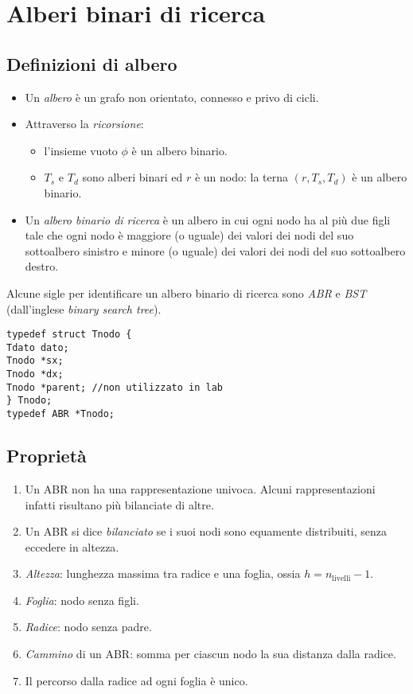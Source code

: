 \chapter{Alberi binari di ricerca}

\section{Definizioni di albero}
\begin{itemize}[noitemsep]
	\item Un \textit{albero} è un grafo non orientato, connesso e privo di cicli.
	\item Attraverso la \textit{ricorsione}:
	\begin{itemize}[noitemsep, nolistsep]
		\item l'insieme vuoto $\phi$ è un albero binario.
		\item $T_s$ e $T_d$ sono alberi binari ed $r$ è un nodo: la terna $(r, T_s, T_d)$ è un albero binario.
	\end{itemize}
	\item Un \textit{albero binario di ricerca} è un albero in cui ogni nodo ha al più due figli tale che ogni nodo è maggiore (o uguale) dei valori dei nodi del suo sottoalbero sinistro e minore (o uguale) dei valori dei nodi del suo sottoalbero destro.
\end{itemize}
Alcune sigle per identificare un albero binario di ricerca sono \textit{ABR} e \textit{BST} (dall'inglese \textit{binary search tree}).

\begin{lstlisting}[title={Implementazione di un albero binario di ricerca}]
typedef struct Tnodo {
Tdato dato;
Tnodo *sx;
Tnodo *dx;
Tnodo *parent; //non utilizzato in lab
} Tnodo;
typedef ABR *Tnodo;
\end{lstlisting}

\section{Proprietà}
\begin{enumerate}[noitemsep]
	\item Un ABR non ha una rappresentazione univoca. Alcuni rappresentazioni infatti risultano più bilanciate di altre.
	\item Un ABR si dice \textit{bilanciato} se i suoi nodi sono equamente distribuiti, senza eccedere in altezza.
	\item \textit{Altezza}: lunghezza massima tra radice e una foglia, ossia $h = n_\text{livelli}-1$.
	\item \textit{Foglia}: nodo senza figli.
	\item \textit{Radice}: nodo senza padre.
	\item \textit{Cammino} di un ABR: somma per ciascun nodo la sua distanza dalla radice.
	\item Il percorso dalla radice ad ogni foglia è unico.
\end{enumerate}


